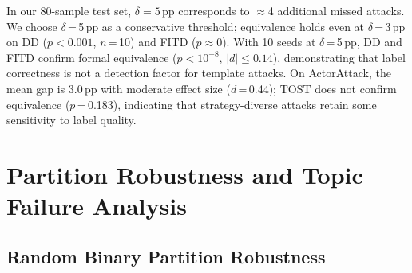 In our 80-sample test set, $\delta = 5$\,pp corresponds to $\approx$4 additional missed attacks. We choose $\delta$\,=\,5\,pp as a conservative threshold; equivalence holds even at $\delta$\,=\,3\,pp on DD ($p < 0.001$, $n$\,=\,10) and FITD ($p \approx 0$). With 10 seeds at $\delta$\,=\,5\,pp, DD and FITD confirm formal equivalence ($p < 10^{-8}$, $|d| \leq 0.14$), demonstrating that label correctness is not a detection factor for template attacks. On ActorAttack, the mean gap is 3.0\,pp with moderate effect size ($d$\,=\,0.44); TOST does not confirm equivalence ($p$\,=\,0.183), indicating that strategy-diverse attacks retain some sensitivity to label quality.

\section{Partition Robustness and Topic Failure Analysis}
\label{app:random_partition}
\label{app:topic_failure}

\subsection{Random Binary Partition Robustness}

\begin{table}[ht]
\centering
\footnotesize
\caption{OOD F1 for 10 random binary partitions of the 9 strategy labels (each partition randomly assigns strategies to group A or B). All partitions use identical Stage-1 DAPT and Stage-2 GRU training; only the binary label mapping differs. Seed 42 (3 runs).}
\label{tab:random_partition}
\end{table}

